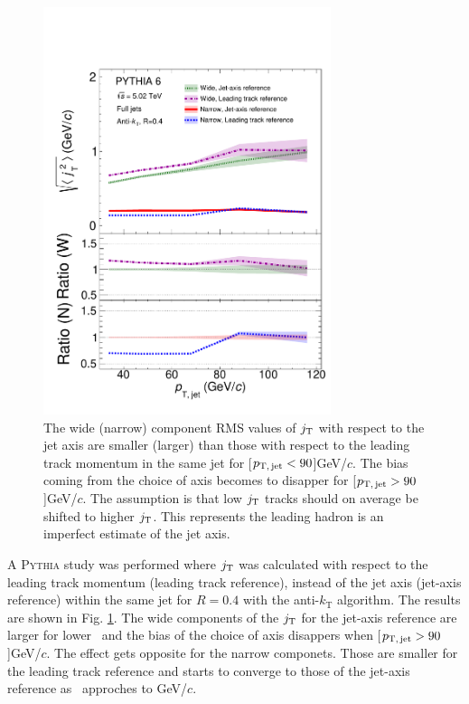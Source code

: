 \begin{figure}[hbt!]
  \centering
  \includegraphics[width=0.75\textwidth]{newfigures/MixedFullJetsR04JetConeJtLeadingRefPtFrom2To6}
  \caption{The wide (narrow) component RMS values of $j_{\rm T}$ with respect to the jet axis are smaller (larger) than those with respect to the leading track momentum in the same jet for \unit[$p_\mathrm{T,\,jet} < 90$]{GeV/$c$}. The bias coming from the choice of axis becomes to disapper for \unit[$p_\mathrm{T,\,jet} > 90$]{GeV/$c$}. The assumption is that low $j_{\rm T}$ tracks should on average be shifted to higher $j_{\rm T}$. This represents the leading hadron is an imperfect estimate of the jet axis.}
  \label{fig:RefComparison}
\end{figure}

A \textsc{Pythia} study was performed where $j_{\rm T}$ was calculated with respect to the leading track momentum (leading track reference), instead of the jet axis (jet-axis reference) within the same jet for $R=0.4$ with the anti-$k_\mathrm{T}$ algorithm. The results are shown in Fig. \ref{fig:RefComparison}. The wide components of the $j_{\rm T}$ for the jet-axis reference are larger for lower \ptjet\ and the bias of the choice of axis disappers when \unit[$p_\mathrm{T,\,jet} > 90$]{GeV/$c$}. The effect gets opposite for the narrow componets. Those are smaller for the leading track reference and starts to converge to those of the jet-axis reference as \ptjet\ approches to \unit[90]{GeV/$c$}.  

